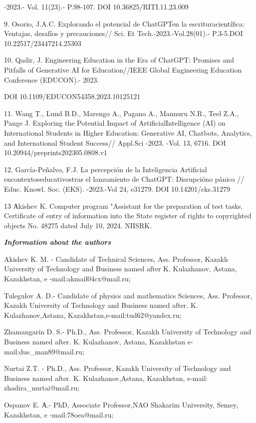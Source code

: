 \begin{noparindent}
-2023.- Vol. 11(23).- P.98-107. DOI 10.36825/RITI.11.23.009

9. Osorio, J.A.C. Explorando el potencial de ChatGPTen la
escrituracientífica: Ventajas, desafíos y precauciones// Sci. Et
Tech.-2023.-Vol.28(01).- P.3-5.DOI 10.22517/23447214.25303

10. Qadir, J. Engineering Education in the Era of ChatGPT: Promises and
Pitfalls of Generative AI for Education//IEEE Global Engineering
Education Conference (EDUCON).- 2023.

DOI 10.1109/EDUCON54358.2023.10125121

11. Wang T., Lund B.D., Marengo A., Pagano A., Mannuru N.R., Teel Z.A.,
Pange J. Exploring the Potential Impact of ArtificialIntelligence (AI)
on International Students in Higher Education: Generative AI, Chatbots,
Analytics, and International Student Success// Appl.Sci -2023. -Vol. 13,
6716. DOI 10.20944/preprints202305.0808.v1

12. García-Peñalvo, F.J. La percepción de la Inteligencia Artificial
encontextoseducativostras el lanzamiento de ChatGPT: Disrupcióno pánico
// Educ. Knowl. Soc. (EKS). -2023.-Vol 24, e31279. DOI
10.14201/eks.31279

13 Аkishev K. Computer program "Assistant for the preparation of test
tasks. Certificate of entry of information into the State register of
rights to copyrighted objects No. 48275 dated July 10, 2024. NIISRK.
\end{noparindent}


\emph{{\bfseries Information about the authors}}
\begin{noparindent}

Akishev K. M. - Candidate of Technical Sciences, Ass. Professor, Kazakh
University of Technology and Business named after K. Kulazhanov, Astana,
Kazakhstan, e -mail:akmail04cx@mail.ru;

Tulegulov A. D.- Candidate of physics and mathematics Sciences, Ass.
Professor, Kazakh University of Technology and Business named after. K.
Kulazhanov,Astana, Kazakhstan,e-mail:tud62@yandex.ru;

Zhamangarin D. S.- Ph.D., Ass. Professor, Kazakh University of
Technology and Business named after. K. Kulazhanov, Astana, Kazakhstan
e-mail:dus\_man89@mail.ru;

Nurtai Z.T. - Ph.D., Ass. Professor, Kazakh University of Technology and
Business named after. K. Kulazhanov,Astana, Kazakhstan, e-mail:
zhadira\_nurtai@mail.ru;

Ospanov E. А.- PhD, Associate Professor,NAO Shakarim University, Semey,
Kazakhstan, e -mail:78oea@mail.ru;
\end{noparindent}

